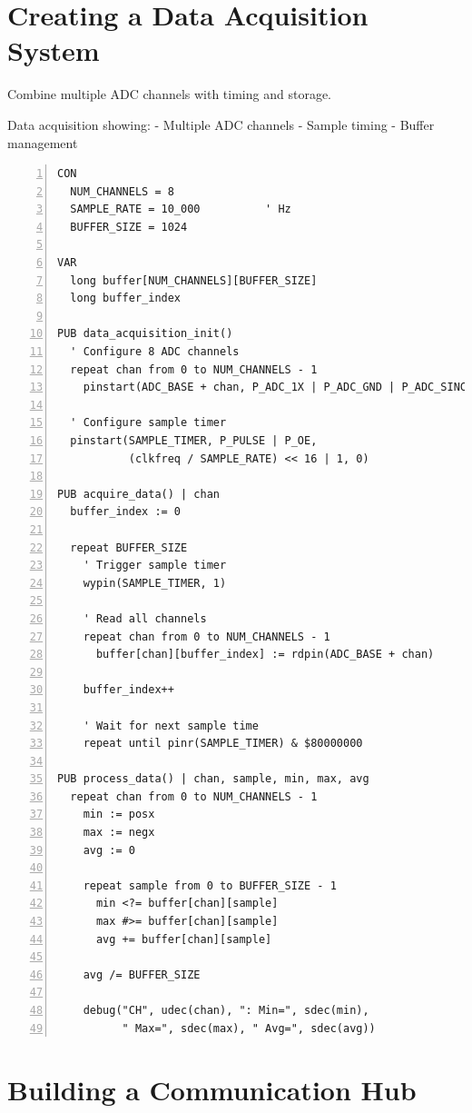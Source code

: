 \documentclass[11pt,a4paper,oneside,english]{book}
\begin{document}
\hypertarget{creating-a-data-acquisition-system}{%
\section{Creating a Data Acquisition
System}\label{creating-a-data-acquisition-system}}

Combine multiple ADC channels with timing and storage.

Data acquisition showing: - Multiple ADC channels - Sample timing -
Buffer management

\begin{Spin2Block}
\begin{Verbatim}[numbers=left,numbersep=5pt,xleftmargin=15pt]
CON
  NUM_CHANNELS = 8
  SAMPLE_RATE = 10_000          ' Hz
  BUFFER_SIZE = 1024
  
VAR
  long buffer[NUM_CHANNELS][BUFFER_SIZE]
  long buffer_index
  
PUB data_acquisition_init()
  ' Configure 8 ADC channels
  repeat chan from 0 to NUM_CHANNELS - 1
    pinstart(ADC_BASE + chan, P_ADC_1X | P_ADC_GND | P_ADC_SINC2, 0, 0)
  
  ' Configure sample timer
  pinstart(SAMPLE_TIMER, P_PULSE | P_OE, 
           (clkfreq / SAMPLE_RATE) << 16 | 1, 0)

PUB acquire_data() | chan
  buffer_index := 0
  
  repeat BUFFER_SIZE
    ' Trigger sample timer
    wypin(SAMPLE_TIMER, 1)
    
    ' Read all channels
    repeat chan from 0 to NUM_CHANNELS - 1
      buffer[chan][buffer_index] := rdpin(ADC_BASE + chan)
    
    buffer_index++
    
    ' Wait for next sample time
    repeat until pinr(SAMPLE_TIMER) & $80000000

PUB process_data() | chan, sample, min, max, avg
  repeat chan from 0 to NUM_CHANNELS - 1
    min := posx
    max := negx
    avg := 0
    
    repeat sample from 0 to BUFFER_SIZE - 1
      min <?= buffer[chan][sample]
      max #>= buffer[chan][sample]
      avg += buffer[chan][sample]
    
    avg /= BUFFER_SIZE
    
    debug("CH", udec(chan), ": Min=", sdec(min), 
          " Max=", sdec(max), " Avg=", sdec(avg))
\end{Verbatim}
\end{Spin2Block}

\hypertarget{building-a-communication-hub}{%
\section{Building a Communication
Hub}\label{building-a-communication-hub}}
\end{document}
